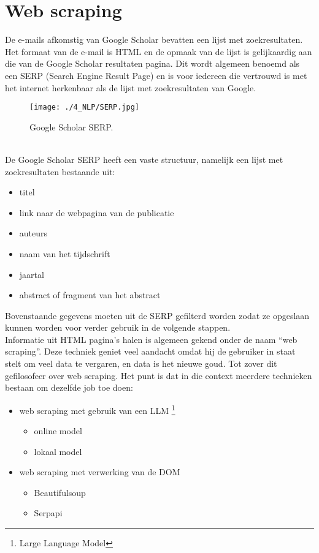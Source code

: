\section{Web scraping}
De e-mails afkomstig van Google Scholar bevatten een lijst met zoekresultaten. Het formaat van de e-mail is HTML en de opmaak van de lijst is gelijkaardig aan die van de Google Scholar resultaten pagina. Dit wordt algemeen benoemd als een SERP (Search Engine Result Page) en is voor iedereen die vertrouwd is met het internet herkenbaar als de lijst met zoekresultaten van Google.
\begin{figure}
    \centering
    \texttt{[image: ./4\_NLP/SERP.jpg]}
    \caption[Google Scholar SERP.]{\label{fig:Google ScholarSERP}Google Scholar SERP.}
\end{figure}\\
De Google Scholar SERP heeft een vaste structuur, namelijk een lijst met zoekresultaten bestaande uit:
\begin{itemize}
    \item titel
    \item link naar de webpagina van de publicatie
    \item auteurs
    \item naam van het tijdschrift
    \item jaartal
    \item abstract of fragment van het abstract
\end{itemize} 
Bovenstaande gegevens moeten uit de SERP gefilterd worden zodat ze opgeslaan kunnen worden voor verder gebruik in de volgende stappen.\\
Informatie uit HTML pagina's halen is algemeen gekend onder de naam ``web scraping''. Deze techniek geniet veel aandacht omdat hij de gebruiker in staat stelt om veel data te vergaren, en data is het nieuwe goud. Tot zover dit gefilosofeer over web scraping. Het punt is dat in die context meerdere technieken bestaan om dezelfde job toe doen:
\begin{itemize}
    \item web scraping met gebruik van een LLM \footnote{Large Language Model}
    \begin{itemize}
        \item online model
        \item lokaal model
    \end{itemize}
    \item web scraping met verwerking van de DOM
    \begin{itemize}
        \item Beautifulsoup
        \item Serpapi
    \end{itemize}
\end{itemize} 

